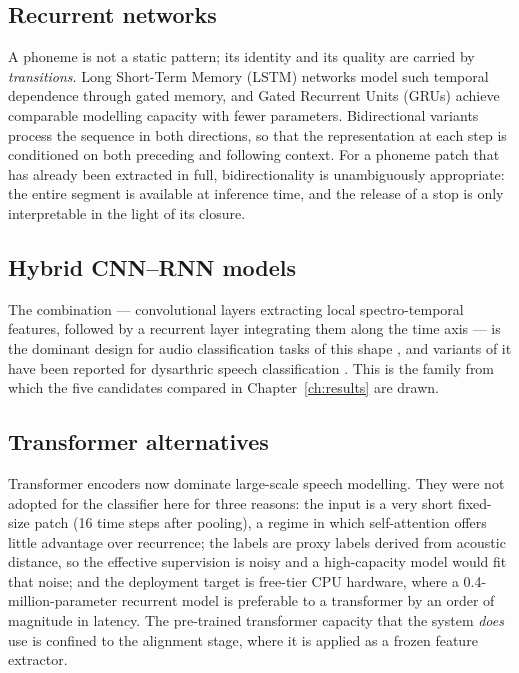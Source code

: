 \subsection{Recurrent networks}

A phoneme is not a static pattern; its identity and its quality are carried by
\emph{transitions}. Long Short-Term Memory (LSTM) networks
\cite{hochreiter1997long} model such temporal dependence through gated memory,
and Gated Recurrent Units (GRUs) \cite{cho2014learning} achieve comparable
modelling capacity with fewer parameters. Bidirectional variants
\cite{schuster1997bidirectional,graves2005framewise} process the sequence in
both directions, so that the representation at each step is conditioned on both
preceding and following context. For a phoneme patch that has already been
extracted in full, bidirectionality is unambiguously appropriate: the entire
segment is available at inference time, and the release of a stop is only
interpretable in the light of its closure.

\subsection{Hybrid CNN--RNN models}

The combination --- convolutional layers extracting local spectro-temporal
features, followed by a recurrent layer integrating them along the time axis
--- is the dominant design for audio classification tasks of this shape
\cite{choi2017convolutional}, and variants of it have been reported for
dysarthric speech classification \cite{joshy2022automated}. This is the family
from which the five candidates compared in Chapter~\ref{ch:results} are drawn.

\subsection{Transformer alternatives}

Transformer encoders now dominate large-scale speech modelling. They were not
adopted for the classifier here for three reasons: the input is a very short
fixed-size patch (16 time steps after pooling), a regime in which self-attention
offers little advantage over recurrence; the labels are proxy labels derived
from acoustic distance, so the effective supervision is noisy and a
high-capacity model would fit that noise; and the deployment target is free-tier
CPU hardware, where a 0.4-million-parameter recurrent model is preferable to a
transformer by an order of magnitude in latency. The pre-trained transformer
capacity that the system \emph{does} use is confined to the alignment stage,
where it is applied as a frozen feature extractor.

